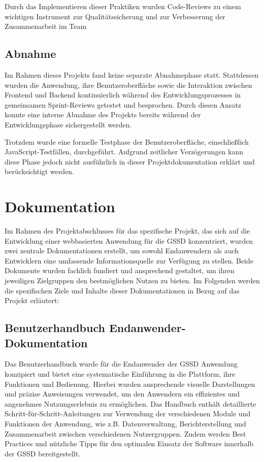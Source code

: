 \begin{flushleft}
Durch das Implementieren dieser Praktiken wurden Code-Reviews zu einem wichtigen Instrument zur Qualitätssicherung und zur Verbesserung der Zusammenarbeit im Team

\subsection{Abnahme}
Im Rahmen dieses Projekts fand keine separate Abnahmephase statt. Stattdessen wurden die Anwendung, ihre Benutzeroberfläche sowie die Interaktion zwischen Frontend und Backend kontinuierlich während des Entwicklungsprozesses in gemeinsamen Sprint-Reviews getestet und besprochen. Durch diesen Ansatz konnte eine interne Abnahme des Projekts bereits während der Entwicklungsphase sichergestellt werden.

Trotzdem wurde eine formelle Testphase der Benutzeroberfläche, einschließlich JavaScript-Testfällen, durchgeführt. Aufgrund zeitlicher Verzögerungen kann diese Phase jedoch nicht ausführlich in dieser Projektdokumentation erklärt und berücksichtigt werden.


\section{Dokumentation}
Im Rahmen des Projektabschlusses für das spezifische Projekt, das sich auf die Entwicklung einer webbasierten Anwendung für die \acs{GSSD} konzentriert, wurden zwei zentrale Dokumentationen erstellt, um sowohl Endanwendern als auch Entwicklern eine umfassende Informationsquelle zur Verfügung zu stellen. Beide Dokumente wurden fachlich fundiert und ansprechend gestaltet, um ihren jeweiligen Zielgruppen den bestmöglichen Nutzen zu bieten. Im Folgenden werden die spezifischen Ziele und Inhalte dieser Dokumentationen in Bezug auf das Projekt erläutert:
\subsection{Benutzerhandbuch Endanwender-Dokumentation}

Das Benutzerhandbuch wurde für die Endanwender der \acs{GSSD} Anwendung konzipiert und bietet eine systematische Einführung in die Plattform, ihre Funktionen und Bedienung. Hierbei wurden ansprechende visuelle Darstellungen und präzise Anweisungen verwendet, um den Anwendern ein effizientes und angenehmes Nutzungserlebnis zu ermöglichen. Das Handbuch enthält detaillierte Schritt-für-Schritt-Anleitungen zur Verwendung der verschiedenen Module und Funktionen der Anwendung, wie z.B. Datenverwaltung, Berichterstellung und Zusammenarbeit zwischen verschiedenen Nutzergruppen. Zudem werden Best Practices und nützliche Tipps für den optimalen Einsatz der Software innerhalb der \acs{GSSD} bereitgestellt.


\end{flushleft}
